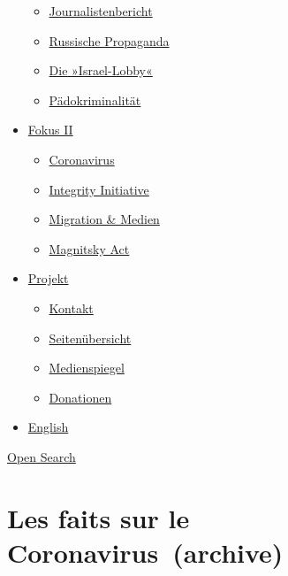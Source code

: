 \begin{itemize}
  \begin{itemize}
  \tightlist
  \item
    \href{https://swprs.org/bericht-eines-journalisten/}{Journalistenbericht}
  \item
    \href{https://swprs.org/russische-propaganda/}{Russische Propaganda}
  \item
    \href{https://swprs.org/die-israel-lobby-fakten-und-mythen/}{Die
    »Israel-Lobby«}
  \item
    \href{https://swprs.org/geopolitik-und-paedokriminalitaet/}{Pädokriminalität}
  \end{itemize}
\item
  \href{https://swprs.org/migration-und-medien/}{Fokus II}

  \begin{itemize}
  \tightlist
  \item
    \href{https://swprs.org/covid-19-hinweis-ii/}{Coronavirus}
  \item
    \href{https://swprs.org/die-integrity-initiative/}{Integrity
    Initiative}
  \item
    \href{https://swprs.org/migration-und-medien/}{Migration \& Medien}
  \item
    \href{https://swprs.org/der-fall-magnitsky/}{Magnitsky Act}
  \end{itemize}
\item
  \href{https://swprs.org/kontakt/}{Projekt}

  \begin{itemize}
  \tightlist
  \item
    \href{https://swprs.org/kontakt/}{Kontakt}
  \item
    \href{https://swprs.org/uebersicht/}{Seitenübersicht}
  \item
    \href{https://swprs.org/medienspiegel/}{Medienspiegel}
  \item
    \href{https://swprs.org/donationen/}{Donationen}
  \end{itemize}
\item
  \href{https://swprs.org/contact/}{English}
\end{itemize}

\protect\hyperlink{}{Open Search}

\hypertarget{les-faits-sur-le-coronavirus-archive}{%
\section{Les faits sur le
Coronavirus~(archive)}\label{les-faits-sur-le-coronavirus-archive}}

